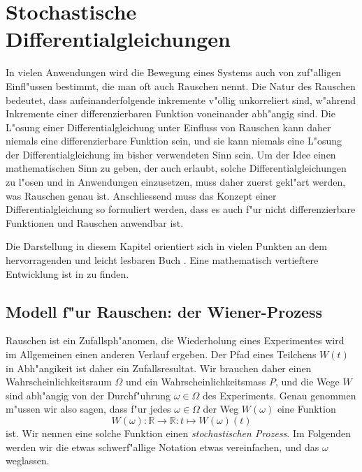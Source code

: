 %
%
\chapter{Stochastische Differentialgleichungen\label{chapter:stochastisch}}
\rhead{}
In vielen Anwendungen wird die Bewegung eines Systems auch von
zuf"alligen Einfl"ussen bestimmt, die man oft auch Rauschen nennt.
Die Natur des Rauschen bedeutet, dass aufeinanderfolgende inkremente
v"ollig unkorreliert sind, w"ahrend Inkremente einer differenzierbaren
Funktion voneinander abh"angig sind.
Die L"osung einer Differentialgleichung unter Einfluss von Rauschen 
kann daher niemals eine differenzierbare Funktion sein, und sie kann
niemals eine L"osung der Differentialgleichung im bisher verwendeten
Sinn sein.
Um der Idee einen mathematischen Sinn zu geben, der auch erlaubt,
solche Differentialgleichungen zu l"osen und in Anwendungen
einzusetzen, muss daher zuerst gekl"art werden, was Rauschen genau ist.
Anschliessend muss das Konzept einer Differentialgleichung so formuliert
werden, dass es auch f"ur nicht differenzierbare Funktionen und Rauschen
anwendbar ist.

Die Darstellung in diesem Kapitel orientiert sich in vielen Punkten
an dem hervorragenden und leicht lesbaren Buch \cite{skript:evans}.
Eine mathematisch vertieftere Entwicklung ist in \cite{skript:oksendal}
zu finden.

%
%
\section{Modell f"ur Rauschen: der Wiener-Prozess\label{section:wiener}}
Rauschen ist ein Zufallsph"anomen, die Wiederholung eines Experimentes
wird im Allgemeinen einen anderen Verlauf ergeben.
Der Pfad eines Teilchens $W(t)$ in Abh"angikeit ist daher ein Zufallsresultat.
Wir brauchen daher einen Wahrscheinlichkeitsraum $\Omega$ und ein
Wahrscheinlichkeitsmass $P$, und die Wege $W$ sind abh"angig von 
der Durchf"uhrung $\omega\in\Omega$ des Experiments. 
Genau genommen m"ussen wir also sagen, dass f"ur jedes $\omega\in\Omega$
der Weg $W(\omega)$ eine Funktion
\[
W(\omega)\colon\mathbb R \to\mathbb R:t\mapsto W(\omega)(t)
\]
ist.
Wir nennen eine solche Funktion einen {\em stochastischen Prozess}.
Im Folgenden werden wir die etwas schwerf"allige Notation etwas
vereinfachen, und das $\omega$ weglassen.

